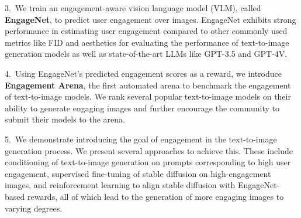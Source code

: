  3.~We train an engagement-aware vision language model (VLM), called \textbf{EngageNet}, to predict user engagement over images. EngageNet exhibits strong performance in estimating user engagement compared to other commonly used metrics like FID and aesthetics for evaluating the performance of text-to-image generation models as well as state-of-the-art LLMs like GPT-3.5 and GPT-4V. 
 
 4.~Using EngageNet's predicted engagement scores as a reward, we introduce \textbf{Engagement Arena}, the first automated arena to benchmark the engagement of text-to-image models. We rank several popular text-to-image models on their ability to generate engaging images and further encourage the community to submit their models to the arena.
 
 
 5.~We demonstrate introducing the goal of engagement in the text-to-image generation process. We present several approaches to achieve this. These include conditioning of text-to-image generation on prompts corresponding to high user engagement, supervised fine-tuning of stable diffusion on high-engagement images, and reinforcement learning to align stable diffusion with EngageNet-based rewards, all of which lead to the generation of more engaging images to varying degrees.
 
 
